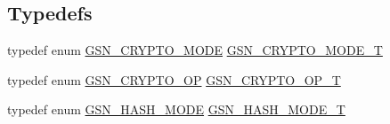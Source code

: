 \subsection*{Typedefs}
\begin{DoxyCompactItemize}
\item 
typedef enum \hyperlink{a00515_a3010ebd2596d115219b29d0a14c1f3f6}{GSN\_\-CRYPTO\_\-MODE} \hyperlink{a00515_ab9bcbd29c0f7622f387e4b527acef326}{GSN\_\-CRYPTO\_\-MODE\_\-T}
\item 
typedef enum \hyperlink{a00515_ab25cef7ae4e4b592cba2ee9ee33d2979}{GSN\_\-CRYPTO\_\-OP} \hyperlink{a00515_aee4f8acfc5b53a56d0710713c26a5fd6}{GSN\_\-CRYPTO\_\-OP\_\-T}
\item 
typedef enum \hyperlink{a00515_a9f050c027d3a6f0f6ea0e5cf4c5b4583}{GSN\_\-HASH\_\-MODE} \hyperlink{a00515_afadc6098eee5910bf340f390d3e0b9f3}{GSN\_\-HASH\_\-MODE\_\-T}
\end{DoxyCompactItemize}
